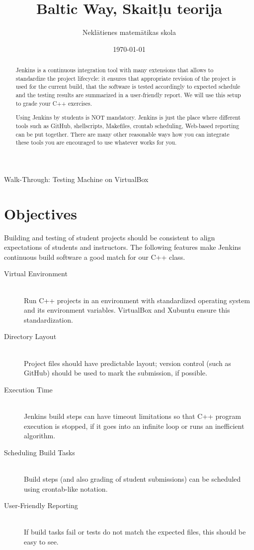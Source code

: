 \documentclass[11pt,a4paper]{article}
\title{\Huge\bfseries \color{FP-Green}Baltic Way, Skaitļu teorija}
\author{Neklātienes matemātikas skola}
\date{\today}
\begin{document}

\begin{center}
{\LARGE Walk-Through:  Testing Machine on VirtualBox}
\end{center}


\begin{abstract}
Jenkins is a continuous integration tool with many extensions that 
allows to standardize the project lifecycle: it ensures that appropriate
revision of the project is used for the current build, that the software is tested 
accordingly to expected schedule and the testing results are summarized in a
user-friendly report. We will use this setup to grade your C++ exercises.

Using Jenkins by students is NOT mandatory. 
Jenkins is just the place where different tools such as GitHub, shellscripts, Makefiles, 
crontab scheduling, Web-based reporting can be put together. 
There are many other reasonable ways how you can integrate these tools \textendash{} you 
are encouraged to use whatever works for you. 
\end{abstract}

\section{Objectives}

Building and testing of student projects should be consistent to align 
expectations of students and instructors. 
The following features make Jenkins continuous build software a
good match for our C++ class.

\begin{description}
\item[Virtual Environment] \hfill \\
Run C++ projects in an environment with standardized 
operating system and its environment variables. VirtualBox and 
Xubuntu ensure this standardization. 
\item[Directory Layout] \hfill \\
Project files should have predictable layout; version control (such as GitHub) should 
be used to mark the submission, if possible.
\item[Execution Time] \hfill \\
Jenkins build steps can have timeout limitations so that C++ program execution is stopped, 
if it goes into an infinite loop or runs an inefficient algorithm.
\item[Scheduling Build Tasks] \hfill \\
Build steps (and also grading of student submissions) can be scheduled using crontab-like notation.
\item[User-Friendly Reporting] \hfill \\
If build tasks fail or tests do not match the expected files, this should be easy to see. 
\end{description}
\end{document}
